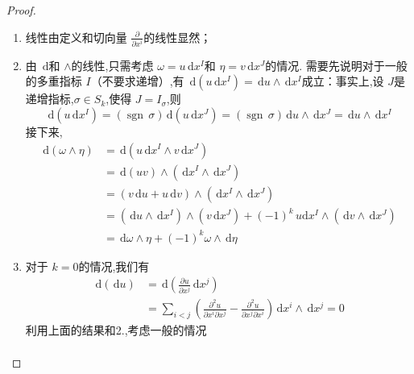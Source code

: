 \documentclass[../../几何与拓扑.tex]{subfiles}
\begin{document}
\begin{proof}
    
\begin{enumerate}
    \item 线性由定义和切向量 $ \frac{\partial }{\partial x^{i}} $的线性显然；
    \item 由 $ \,\mathrm{d}  $和 $ \wedge  $的线性,只需考虑 $  \omega = u\,\mathrm{d} x^{I} $和 $ \eta =v\,\mathrm{d} x^{J} $的情况.
    需要先说明对于一般的多重指标 $ I $（不要求递增）,有 $ \,\mathrm{d} \left( u\,\mathrm{d} x^{I} \right)  = \,\mathrm{d} u \wedge \,\mathrm{d} x^{I}$成立：事实上,设 $ J $是递增指标,$ \sigma \in S_{k} $,使得 $ J= I_{\sigma } $,则 $$
    \,\mathrm{d} \left( u\,\mathrm{d} x^{I} \right) = \left( \operatorname{sgn}\, \sigma  \right)\,\mathrm{d} \left( u\,\mathrm{d} x^{J} \right)= \left( \operatorname{sgn}\,\sigma  \right) \,\mathrm{d} u\wedge \,\mathrm{d} x^{J}= \,\mathrm{d} u\wedge \,\mathrm{d} x^I    
    $$接下来, $$
    \begin{aligned}
    \,\mathrm{d} \left(  \omega \wedge \eta  \right)& =  \,\mathrm{d} \left( u\,\mathrm{d} x^{I}\wedge v\,\mathrm{d} x^{J} \right)\\ 
     & =  \,\mathrm{d} \left( uv  \right)\wedge  \left( \,\mathrm{d} x^{I}\wedge \,\mathrm{d} x^{J} \right)\\ 
      & = \left( v\,\mathrm{d} u+ u\,\mathrm{d} v \right)\wedge  \left( \,\mathrm{d} x^{I}\wedge \,\mathrm{d} x^{J} \right)\\ 
       & =   \left( \,\mathrm{d} u\wedge \,\mathrm{d}x ^{I} \right)\wedge \left( v\,\mathrm{d} x^{J} \right)+     \left( -1 \right)^{k} \,u\mathrm{d} x^{I}\wedge  \left( \,\mathrm{d} v\wedge \,\mathrm{d} x^{J} \right) \\ 
        & = \,\mathrm{d}  \omega \wedge \eta + \left( -1 \right)^{k}  \omega \wedge \,\mathrm{d} \eta  
    \end{aligned}
    $$
    \item 对于 $ k=0 $的情况,我们有 $$
    \begin{aligned}
    \,\mathrm{d} \left( \,\mathrm{d} u \right) & = \,\mathrm{d} \left( \frac{\partial u}{\partial x^{j}}\,\mathrm{d} x^{j} \right)\\ 
     & =    \sum _{i<j} \left( \frac{\partial ^{2}u}{\partial x^{i} \partial x^{j}}- \frac{\partial ^{2}u}{\partial x^{j} \partial x^{i}} \right) \,\mathrm{d} x^{i}\wedge \,\mathrm{d} x^{j}=0 
    \end{aligned}
    $$利用上面的结果和2.,考虑一般的情况 $$
    \begin{aligned}

\end{aligned}$$
\end{enumerate}
\end{proof}
\end{document}
